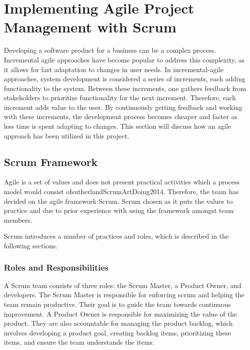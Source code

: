 \section{Implementing Agile Project Management with Scrum}
Developing a software product for a business can be a complex process.
Incremental agile approaches have become popular to address this complexity, as it allows for fast adaptation to changes in user needs. \cite{sommervilleSoftwareEngineering2016}
In incremental-agile approaches, system development is considered a series of increments, each adding functionality to the system.
Between these increments, one gathers feedback from stakeholders to prioritize functionality for the next increment.
Therefore, each increment adds value to the user.
By continuously getting feedback and working with these increments, the development process becomes cheaper and faster as less time is spent adapting to changes.\cite{sommervilleSoftwareEngineering2016}
This section will discuss how an agile approach has been utilized in this project. 

\subsection{Scrum Framework}
Agile is a set of values and does not present practical activities which a process model would consist of{sutherlandScrumArtDoing2014}.
Therefore, the team has decided on the agile framework Scrum\cite{scrumdotorg}. Scrum chosen as it puts the values to practice and due to prior experience with using the framework amongst team members. 

Scrum introduces a number of practices and roles, which is described in the following sections. 

\subsubsection*{Roles and Responsibilities}
A Scrum team consists of three roles: the Scrum Master, a Product Owner, and developers.
The Scrum Master is responsible for enforcing scrum and helping the team remain productive.
Their goal is to guide the team towards continuous improvement.
A Product Owner is responsible for maximizing the value of the product.
They are also accountable for managing the product backlog, which involves developing a product goal, creating backlog items, prioritizing these items, and ensure the team understands the items. \cite{scrumdotorg}

